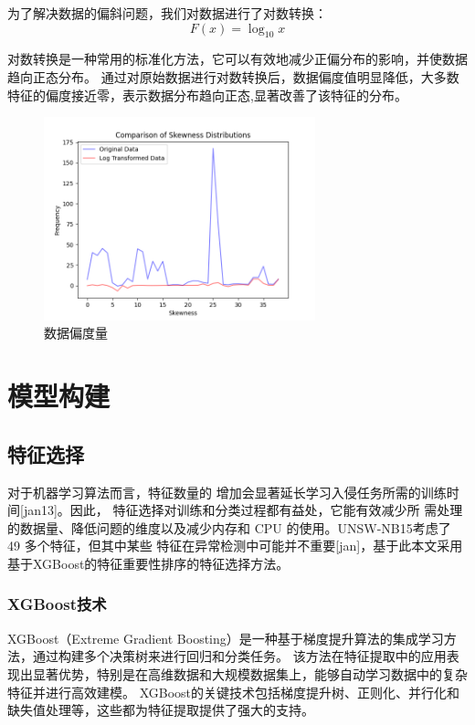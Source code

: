 \documentclass{article}
\begin{document}
为了解决数据的偏斜问题，我们对数据进行了对数转换：
\begin{equation}
 F(x)= \log _{10} x
\end{equation}

对数转换是一种常用的标准化方法，它可以有效地减少正偏分布的影响，并使数据趋向正态分布。
通过对原始数据进行对数转换后，数据偏度值明显降低，大多数特征的偏度接近零，表示数据分布趋向正态,显著改善了该特征的分布。
\begin{figure}[H]
  \centering
  \includegraphics[width=0.7\textwidth]{./png/skewness.png}
  \caption{数据偏度量}
  \label{fig:skew}
\end{figure}



\section{模型构建}
\subsection{特征选择}
对于机器学习算法而言，特征数量的
增加会显著延长学习入侵任务所需的训练时间[jan13]。因此，
特征选择对训练和分类过程都有益处，它能有效减少所
需处理的数据量、降低问题的维度以及减少内存和 CPU 
的使用。UNSW-NB15考虑了 49 多个特征，但其中某些
特征在异常检测中可能并不重要[jan]，基于此本文采用
基于XGBoost的特征重要性排序的特征选择方法。
\subsubsection{XGBoost技术}
XGBoost（Extreme Gradient Boosting）是一种基于梯度提升算法的集成学习方法，通过构建多个决策树来进行回归和分类任务。
该方法在特征提取中的应用表现出显著优势，特别是在高维数据和大规模数据集上，能够自动学习数据中的复杂特征并进行高效建模。
XGBoost的关键技术包括梯度提升树、正则化、并行化和缺失值处理等，这些都为特征提取提供了强大的支持。
\end{document}

